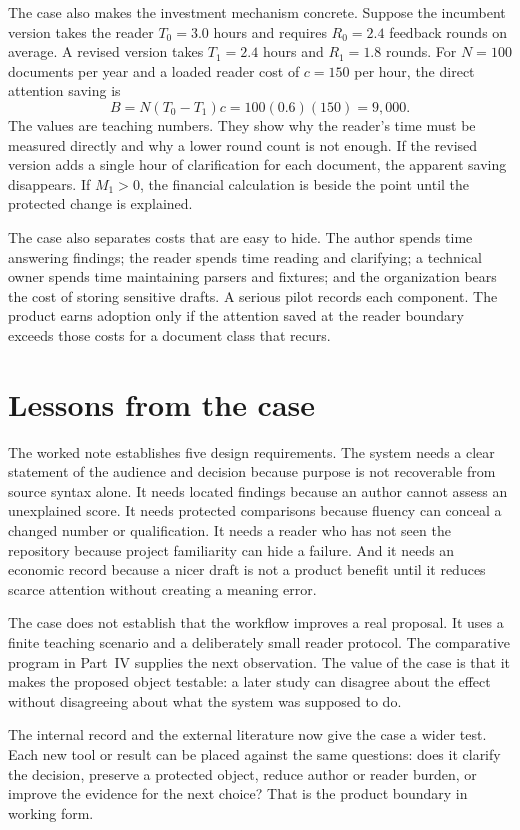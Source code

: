The case also makes the investment mechanism concrete. Suppose the incumbent
version takes the reader $T_0=3.0$ hours and requires $R_0=2.4$ feedback rounds
on average. A revised version takes $T_1=2.4$ hours and $R_1=1.8$ rounds. For
$N=100$ documents per year and a loaded reader cost of $c=150$ per hour, the
direct attention saving is
\begin{equation}
  B = N(T_0-T_1)c = 100(0.6)(150)=9{,}000.
  \label{eq:case-benefit}
\end{equation}
The values are teaching numbers. They show why the reader's time must be
measured directly and why a lower round count is not enough. If the revised
version adds a single hour of clarification for each document, the apparent
saving disappears. If $M_1>0$, the financial calculation is beside the point
until the protected change is explained.

The case also separates costs that are easy to hide. The author spends time
answering findings; the reader spends time reading and clarifying; a technical
owner spends time maintaining parsers and fixtures; and the organization bears
the cost of storing sensitive drafts. A serious pilot records each component.
The product earns adoption only if the attention saved at the reader boundary
exceeds those costs for a document class that recurs.

\section{Lessons from the case}
\label{sec:case-lessons}

The worked note establishes five design requirements. The system needs a clear
statement of the audience and decision because purpose is not recoverable from
source syntax alone. It needs located findings because an author cannot assess
an unexplained score. It needs protected comparisons because fluency can conceal
a changed number or qualification. It needs a reader who has not seen the
repository because project familiarity can hide a failure. And it needs an
economic record because a nicer draft is not a product benefit until it reduces
scarce attention without creating a meaning error.

The case does not establish that the workflow improves a real proposal. It uses
a finite teaching scenario and a deliberately small reader protocol. The
comparative program in Part~IV supplies the next observation. The value of the
case is that it makes the proposed object testable: a later study can disagree
about the effect without disagreeing about what the system was supposed to do.

The internal record and the external literature now give the case a wider
test. Each new tool or result can be placed against the same questions: does it
clarify the decision, preserve a protected object, reduce author or reader
burden, or improve the evidence for the next choice? That is the product
boundary in working form.
